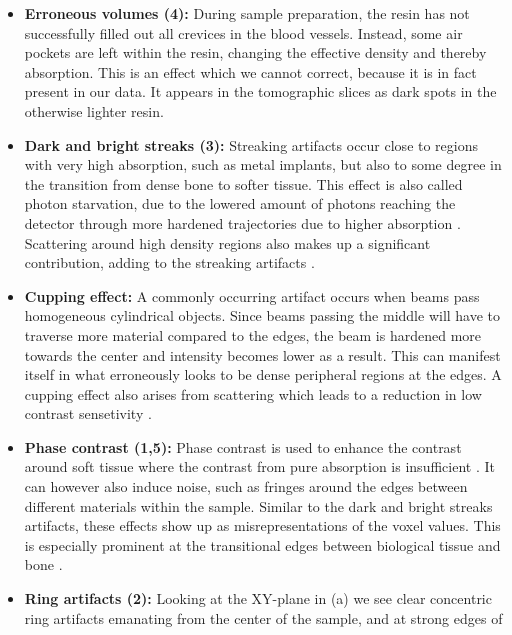 \begin{itemize}
	\item \textbf{Erroneous volumes (4):} During sample preparation, the
		resin has not successfully filled out all crevices in the blood
		vessels. Instead, some air pockets are left within the resin,
		changing the effective density and thereby absorption. This is
		an effect which we cannot correct, because it is in fact
		present in our data. It appears in the tomographic slices
		 as dark spots in the otherwise lighter resin. 
	\item \textbf{Dark and bright streaks (3):} Streaking artifacts occur
		close to regions with very high absorption, such as metal
		implants, but also to some degree in the transition from dense
		bone to softer tissue.  This effect is also called photon
		starvation, due to the lowered amount of photons reaching the
		detector through more hardened trajectories due to higher
		absorption \citep{srnoise}. Scattering around high density
		regions also makes up a significant contribution, adding to the
		streaking artifacts \citep{scatter_sr_ct}.
	\item \textbf{Cupping effect:} A commonly occurring artifact occurs
		when beams pass homogeneous cylindrical objects. Since beams
		passing the middle will have to traverse more material compared
		to the edges, the beam is hardened more towards the center and
		intensity becomes lower as a result. This can manifest itself
		in what erroneously looks to be dense peripheral regions at the
		edges. A cupping effect also arises from scattering which leads
		to a reduction in low contrast sensetivity
		\citep{sr_streak_artifacts_scatter}.
	\item \textbf{Phase contrast (1,5):} Phase contrast is used to enhance
		the contrast around soft tissue where the contrast from pure
		absorption is insufficient \citep{phasecontrast}. It can
		however also induce noise, such as fringes around the edges
		between different materials within the sample\citep{srnoise}.
		Similar to the dark and bright streaks artifacts, these effects
		show up as misrepresentations of the voxel values. This is
		especially prominent at the transitional edges between
		biological tissue and bone \citep{sr_streak_artifacts_scatter}.
	\item \textbf{Ring artifacts (2):} Looking at the XY-plane in
		(a) we see clear concentric ring artifacts
		emanating from the center of the sample, and at strong edges of

\end{itemize}
